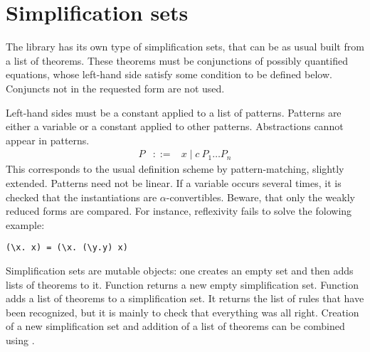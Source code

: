 \section{Simplification sets}

The  library has its own type of simplification sets, that
can be as usual built from a list of theorems. These theorems must be
conjunctions of possibly quantified equations, whose left-hand side
satisfy some condition to be defined below. Conjuncts not in the
requested form are not used.

Left-hand sides must be a constant applied to a list of
patterns. Patterns are either a variable or a constant applied to
other patterns. Abstractions cannot appear in patterns.
\begin{eqnarray*}
P & ::= & x \mid c~P_1 \ldots P_n
\end{eqnarray*}
This corresponds to the usual definition scheme by pattern-matching,
slightly extended. Patterns need not be linear. If a variable occurs
several times, it is checked that the instantiations are
$\alpha$-convertibles. Beware, that only the weakly reduced forms are
compared. For instance, reflexivity fails to solve the folowing example:
\begin{verbatim}
(\x. x) = (\x. (\y.y) x)
\end{verbatim}


Simplification sets are mutable objects: one creates an empty set and
then adds lists of theorems to it. Function  returns a
new empty simplification set. Function  adds a list
of theorems to a simplification set. It returns the list of rules that
have been recognized, but it is mainly to check that everything was
all right. Creation of a new simplification set and addition of a list
of theorems can be combined using .
